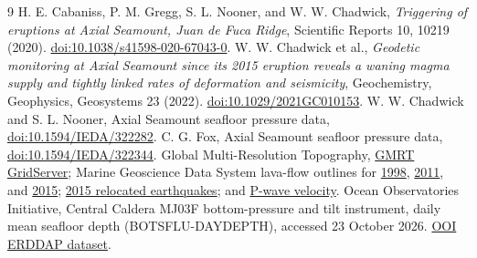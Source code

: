 \documentclass[10pt]{article}
\begin{document}
\begin{thebibliography}{9}
 H. E. Cabaniss, P. M. Gregg, S. L. Nooner, and
W. W. Chadwick, \emph{Triggering of eruptions at Axial Seamount, Juan de
Fuca Ridge}, Scientific Reports 10, 10219 (2020).
\href{https://doi.org/10.1038/s41598-020-67043-0}{doi:10.1038/s41598-020-67043-0}.
 W. W. Chadwick et al., \emph{Geodetic monitoring at
Axial Seamount since its 2015 eruption reveals a waning magma supply and
tightly linked rates of deformation and seismicity}, Geochemistry,
Geophysics, Geosystems 23 (2022).
\href{https://doi.org/10.1029/2021GC010153}{doi:10.1029/2021GC010153}.
 W. W. Chadwick and S. L. Nooner, Axial Seamount seafloor
pressure data, \href{https://doi.org/10.1594/IEDA/322282}{doi:10.1594/IEDA/322282}.
 C. G. Fox, Axial Seamount seafloor pressure data,
\href{https://doi.org/10.1594/IEDA/322344}{doi:10.1594/IEDA/322344}.
 Global Multi-Resolution Topography,
\href{https://www.gmrt.org/}{GMRT GridServer};
Marine Geoscience Data System lava-flow outlines for
\href{https://doi.org/10.1594/IEDA/323601}{1998},
\href{https://doi.org/10.1594/IEDA/324416}{2011}, and
\href{https://doi.org/10.1594/IEDA/324418}{2015};
\href{https://doi.org/10.1594/IEDA/324421}{2015 relocated earthquakes};
and \href{https://doi.org/10.1594/IEDA/324420}{P-wave velocity}.
 Ocean Observatories Initiative, Central Caldera MJ03F
bottom-pressure and tilt instrument, daily mean seafloor depth
(BOTSFLU-DAYDEPTH), accessed 23 October 2026.
\href{https://erddap.dataexplorer.oceanobservatories.org/erddap/info/ooi-rs03ccal-mj03f-05-botpta301/index.html}{OOI ERDDAP dataset}.
\end{thebibliography}
\end{document}
